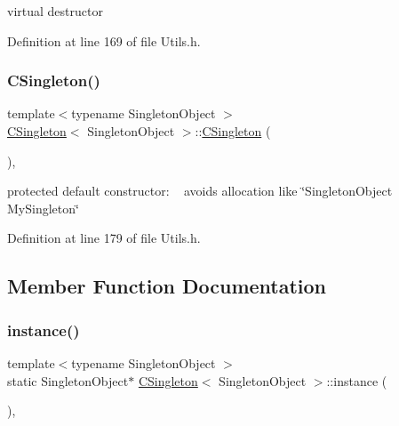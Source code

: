 virtual destructor 



Definition at line 169 of file Utils.\+h.

\mbox{\label{classCSingleton_aa03a7284f8092927696c3a94ef87cf31}} 
\subsubsection{\texorpdfstring{C\+Singleton()}{CSingleton()}}
{\footnotesize\ttfamily template$<$typename Singleton\+Object $>$ \\
\hyperlink{classCSingleton}{C\+Singleton}$<$ Singleton\+Object $>$\+::\hyperlink{classCSingleton}{C\+Singleton} (\begin{DoxyParamCaption}{ }\end{DoxyParamCaption})\hspace{0.3cm}{\ttfamily [inline]}, {\ttfamily [protected]}}



protected default constructor\+: ~\newline
 avoids allocation like \char`\"{}\+Singleton\+Object My\+Singleton\char`\"{} 



Definition at line 179 of file Utils.\+h.



\subsection{Member Function Documentation}
\mbox{\label{classCSingleton_a58f5ac3aaaea8079a373350594726bdf}} 
\subsubsection{\texorpdfstring{instance()}{instance()}}
{\footnotesize\ttfamily template$<$typename Singleton\+Object $>$ \\
static Singleton\+Object$\ast$ \hyperlink{classCSingleton}{C\+Singleton}$<$ Singleton\+Object $>$\+::instance (\begin{DoxyParamCaption}{ }\end{DoxyParamCaption})\hspace{0.3cm}{\ttfamily [inline]}, {\ttfamily [static]}}



